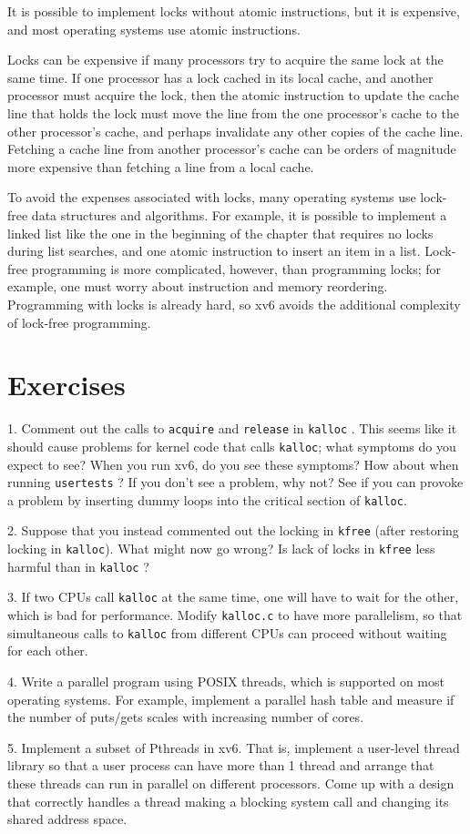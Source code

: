 It is possible to implement locks without atomic instructions, but it is
expensive, and most operating systems use atomic instructions.

Locks can be expensive if many processors try to acquire the same lock
at the same time.  If one processor has a lock
cached in its local cache, and another processor must acquire the lock, then the
atomic instruction to update the cache line that holds the lock must move the line
from the one processor's cache to the other processor's cache, and perhaps
invalidate any other copies of the cache line.  Fetching a cache line from
another processor's cache can be orders of magnitude more expensive than
fetching a line from a local cache.

To avoid the expenses associated with locks, many operating systems use
lock-free data structures and algorithms.  For example, it is possible to
implement a linked list like the one in the beginning of the chapter that
requires no locks during list searches, and one atomic instruction to insert an
item in a list.  Lock-free programming is more complicated, however, than
programming locks; for example, one must worry about instruction and memory
reordering.  Programming with locks is already hard, so xv6 avoids the
additional complexity of lock-free programming.
\section{Exercises}

1. Comment out the calls to
\lstinline{acquire}
and
\lstinline{release}
in
\lstinline{kalloc}
.
This seems like it should cause problems for
kernel code that calls
\lstinline{kalloc};
what symptoms do you expect to see?
When you run xv6, do you see these symptoms?
How about when running
\lstinline{usertests} ?
If you don't see a problem, why not?
See if you can provoke a problem by inserting
dummy loops into the critical section of
\lstinline{kalloc}.

2. Suppose that you instead commented out the
locking in
\lstinline{kfree} 
(after restoring locking in
\lstinline{kalloc}).
What might now go wrong? Is lack of locks in
\lstinline{kfree}
less harmful than in
\lstinline{kalloc} ?

3. If two CPUs call
\lstinline{kalloc}
at the same time, one will have to wait for the other,
which is bad for performance.
Modify 
\lstinline{kalloc.c}
to have more parallelism, so that simultaneous
calls to
\lstinline{kalloc}
from different CPUs can proceed without waiting for each other.

4. Write a parallel program using POSIX threads, which is supported on most
operating systems. For example, implement a parallel hash table and measure if
the number of puts/gets scales with increasing number of cores.

5. Implement a subset of Pthreads in xv6.  That is, implement a user-level
thread library so that a user process can have more than 1 thread and arrange
that these threads can run in parallel on different processors.  Come up with a
design that correctly handles a thread making a blocking system call and
changing its shared address space.
